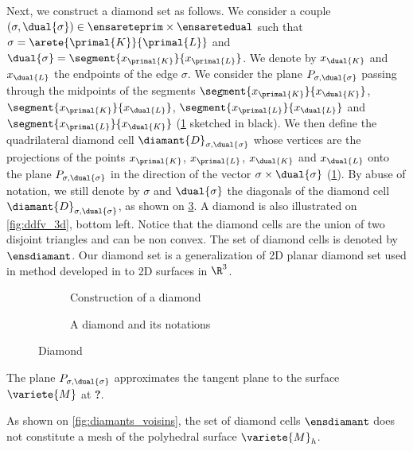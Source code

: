 Next, we construct a diamond set as follows. We consider a couple $(\sigma, \dual{\sigma}) \in \ensareteprim \times \ensaretedual$ such that $\sigma = \arete{\primal{K}}{\primal{L}}$ and $\dual{\sigma} = \segment{x_{\primal{K}}}{x_{\primal{L}}}$. We denote by $x_{\dual{K}}$ and $x_{\dual{L}}$ the endpoints of the edge $\sigma$. We consider the plane $P_{\sigma, \dual{\sigma}}$ passing through the midpoints of the segments $\segment{x_{\primal{K}}}{x_{\dual{K}}}$, $\segment{x_{\primal{K}}}{x_{\dual{L}}}$, $\segment{x_{\primal{L}}}{x_{\dual{L}}}$ and $\segment{x_{\primal{L}}}{x_{\dual{K}}}$ (\ref{fig:ddfv_3d_diamant} sketched in black). We then define the quadrilateral diamond cell $\diamant{D}_{\sigma, \dual{\sigma}}$ whose vertices are the projections of the points $x_{\primal{K}}$, $x_{\primal{L}}$, $x_{\dual{K}}$ and $x_{\dual{L}}$ onto the plane $P_{\sigma, \dual{\sigma}}$ in the direction of the vector $\sigma \times \dual{\sigma}$ (\ref{fig:ddfv_3d_diamant}). By abuse of notation, we still denote by $\sigma$ and $\dual{\sigma}$ the diagonals of the diamond cell $\diamant{D}_{\sigma, \dual{\sigma}}$, as shown on \ref{fig:diamant_int}. A diamond is also illustrated on \ref{fig:ddfv_3d}, bottom left. Notice that the diamond cells are the union of two disjoint triangles and can be non convex. The set of diamond cells is denoted by $\ensdiamant$. Our diamond set is a generalization of 2D planar diamond set used in \ddfv method developed in \cite{domelevo_finite_2005} to 2D surfaces in $\R^3$. 

\begin{figure}[H]
\centering
\begin{subfigure}[c]{.5\textwidth}
    \centering
    
    \caption{Construction of a diamond}
    \label{fig:ddfv_3d_diamant}
\end{subfigure}%
\begin{subfigure}[c]{.5\textwidth}
    \centering
    
    \caption{A diamond and its notations}
    \label{fig:diamant_int}
\end{subfigure}
\caption{Diamond}
\end{figure}

\begin{remarque}
    The plane $P_{\sigma, \dual{\sigma}}$ approximates the tangent plane to the surface $\variete{M}$ at \textbf{?}.
\end{remarque}

\begin{remarque}
    As shown on \ref{fig:diamants_voisins}, the set of diamond cells $\ensdiamant$ does not constitute a mesh of the polyhedral surface $\variete{M}_h$.
\end{remarque}

